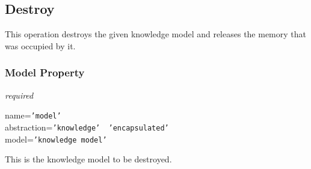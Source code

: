 %
%
%
%
%
%

\subsection{Destroy}
\label{destroy_heading}

This operation destroys the given knowledge model and releases the memory that
was occupied by it.

\subsubsection{Model Property}

\emph{required}

name=\texttt{'model'}\\
abstraction=\texttt{'knowledge' \vline\ 'encapsulated'}\\
model=\texttt{'knowledge model'}

This is the knowledge model to be destroyed.
